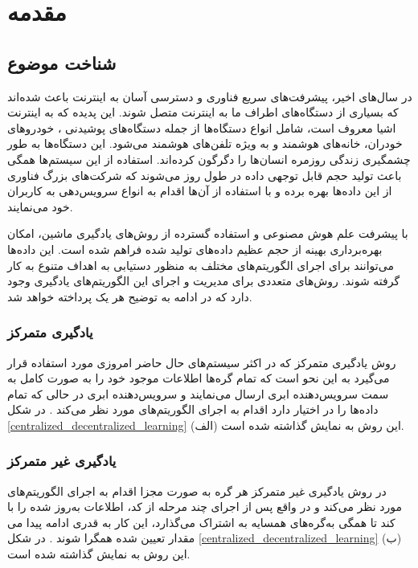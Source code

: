 \chapter{مقدمه}

\section{شناخت موضوع}
در سال‌های اخیر، پیشرفت‌های سریع فناوری و دسترسی آسان به اینترنت باعث شده‌اند که بسیاری از دستگاه‌های اطراف ما به اینترنت متصل شوند. این پدیده که به اینترنت اشیا%
معروف است، شامل انواع دستگاه‌ها از جمله دستگاه‌های پوشیدنی%
%
، خودروهای خودران، خانه‌های هوشمند%
و به ویژه تلفن‌های هوشمند%
می‌شود. این دستگاه‌ها به طور چشمگیری زندگی روزمره انسان‌ها را دگرگون کرده‌اند. استفاده از این سیستم‌ها همگی باعث تولید حجم قابل توجهی داده در طول روز می‌شوند که شرکت‌های بزرگ فناوری از این داده‌ها بهره برده و با استفاده از آن‌ها اقدام به انواع سرویس‌‌دهی به کاربران خود می‌نمایند.

با پیشرفت علم هوش مصنوعی و استفاده گسترده از روش‌های یادگیری ماشین، امکان بهره‌برداری بهینه از حجم عظیم داده‌های تولید شده فراهم شده است. این داده‌ها می‌توانند برای اجرای الگوریتم‌های مختلف به منظور دستیابی به اهداف متنوع به کار گرفته شوند. روش‌های متعددی برای مدیریت و اجرای این الگوریتم‌های یادگیری وجود دارد که در ادامه به توضیح هر یک پرداخته خواهد شد.

\subsection{یادگیری متمرکز}
روش یادگیری متمرکز%
که در اکثر سیستم‌های حال حاضر امروزی مورد استفاده قرار می‌گیرد به این نحو است که تمام  گره‌ها%
اطلاعات موجود خود را به صورت کامل به سمت سرویس‌دهنده ابری%
ارسال می‌نمایند و سرویس‌دهنده ابری در حالی که تمام داده‌ها را در اختیار دارد اقدام به اجرای الگوریتم‌های مورد نظر می‌کند
\cite{elbir2022family}%
. در شکل
\ref{centralized_decentralized_learning}%
(الف) این روش به نمایش گذاشته شده است.


\subsection{یادگیری غیر متمرکز}
در روش یادگیری غیر متمرکز%
هر گره به صورت مجزا اقدام به اجرای الگوریتم‌های مورد نظر می‌کند و در واقع پس از اجرای چند مرحله از کد، اطلاعات به‌روز شده را با گره‌های همسایه به اشتراک می‌گذارد، این کار به قدری ادامه پیدا می‌‎کند تا همگی به مقدار تعیین شده همگرا شوند
\cite{zhou2019edge}%
. در شکل
\ref{centralized_decentralized_learning}%
(ب) این روش به نمایش گذاشته شده است.


